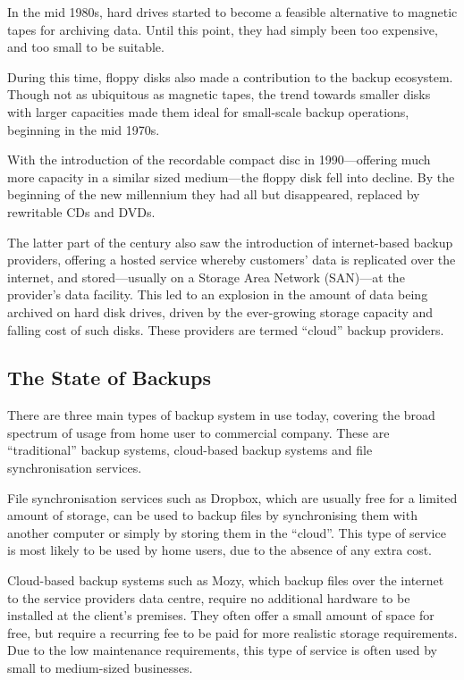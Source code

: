 In the mid 1980s, hard drives started to become a feasible alternative to
magnetic tapes for archiving data. Until this point, they had simply been too
expensive, and too small to be suitable.

During this time, floppy disks also made a contribution to the backup
ecosystem. Though not as ubiquitous as magnetic tapes, the trend towards
smaller disks with larger capacities made them ideal for small-scale backup
operations, beginning in the mid 1970s.

With the introduction of the recordable compact disc in 1990---offering
much more capacity in a similar sized medium---the floppy disk fell into
decline. By the beginning of the new millennium they had all but disappeared,
replaced by rewritable CDs and DVDs.

The latter part of the century also saw the introduction of internet-based
backup providers, offering a hosted service whereby customers' data is
replicated over the internet, and stored---usually on a Storage Area Network
(SAN)---at the provider's data facility. This led to an explosion in the amount
of data being archived on hard disk drives, driven by the ever-growing storage
capacity and falling cost of such disks. These providers are termed ``cloud''
backup providers.

\subsection{The State of Backups}

There are three main types of backup system in use today, covering the broad
spectrum of usage from home user to commercial company. These are
``traditional'' backup systems, cloud-based backup systems and file
synchronisation services.

File synchronisation services such as Dropbox, which are usually free for
a limited amount of storage, can be used to backup files by synchronising them
with another computer or simply by storing them in the ``cloud''. This type of
service is most likely to be used by home users, due to the absence of any
extra cost.

Cloud-based backup systems such as Mozy, which backup files over the internet
to the service providers data centre, require no additional hardware to be
installed at the client's premises. They often offer a small amount of space
for free, but require a recurring fee to be paid for more realistic storage
requirements. Due to the low maintenance requirements, this type of service is
often used by small to medium-sized businesses.

